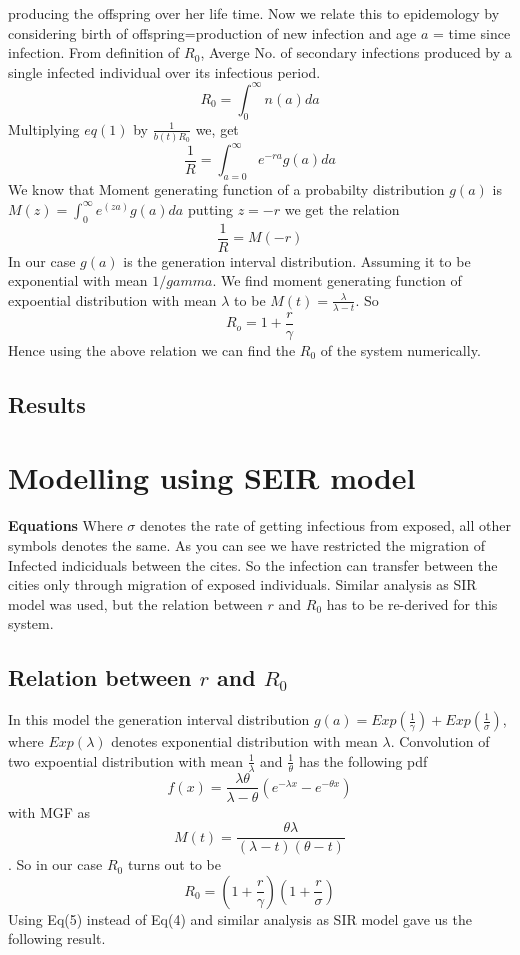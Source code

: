 \documentclass{article}
\begin{document}
producing the offspring over her life time.  Now we relate this to
epidemology by considering birth of offspring=production of new
infection and age $a$ = time since infection. \newline From definition
of $R_{0}$, Averge No. of secondary infections produced by a single infected
individual over its infectious period.
\begin{equation}
R_{0}=\int_{0}^{\infty}n(a)da
\end{equation}
Multiplying $eq(1)$ by $\frac{1}{b(t)R_{0}}$ we, get
$$\frac{1}{R}=\int_{a=0}^{\infty}e^{-ra}g(a)da$$ We know that Moment
generating function of a probabilty distribution $g(a)$ is
$M(z)=\int_{0}^{\infty}e^(za)g(a)da$ putting $z=-r$ we get the relation
\begin{equation}
  \frac{1}{R}=M(-r)
\end{equation}
In our case $g(a)$ is the generation interval distribution. Assuming
it to be exponential with mean $1/gamma$. We find moment generating
function of expoential distribution with mean $\lambda$ to be
$M(t)=\frac{\lambda}{\lambda-t}$. So
\begin{equation}
  R_{o}=1+\frac{r}{\gamma}
\end{equation}
Hence using the above relation we can find the $R_{0}$ of the system numerically.
\subsection{Results}
\section{Modelling using SEIR model}
\textbf{Equations} \newline
Where $\sigma$ denotes the rate of getting infectious from exposed,
all other symbols denotes the same. As you can see we have restricted
the migration of Infected indiciduals between the cites. So the
infection can transfer between the cities only through migration of
exposed individuals. \newline Similar analysis as SIR model was used,
but the relation between $r$ and $R_{0}$ has to be re-derived for this
system.
\subsection{Relation between $r$ and $R_{0}$}
In this model the generation interval distribution
$g(a)=Exp(\frac{1}{\gamma})+Exp(\frac{1}{\sigma})$, where $Exp(\lambda)$
denotes exponential distribution with mean $\lambda$. \newline
Convolution of two expoential distribution with mean
$\frac{1}{\lambda}$ and $\frac{1}{\theta}$ has the following pdf
$$f(x)=\frac{\lambda \theta}{\lambda - \theta}(e^{- \lambda x}-e^{-\theta x})$$
with MGF as
$$M(t)=\frac{\theta \lambda}{(\lambda-t)(\theta-t)}$$.
So in our case $R_{0}$ turns out to be
\begin{equation}
R_{0}=(1+\frac{r}{\gamma})(1+\frac{r}{\sigma})
\end{equation}
Using Eq(5) instead of Eq(4) and similar analysis as SIR model gave us the following result.
\end{document}
